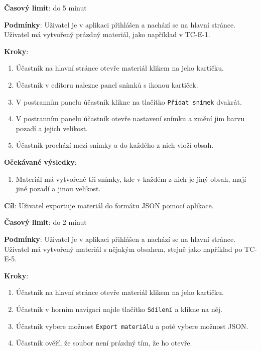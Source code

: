 \textbf{Časový limit}: do 5 minut

\textbf{Podmínky}:  Uživatel je v aplikaci přihlášen a nachází se na hlavní stránce. Uživatel má vytvořený prázdný materiál, jako například v TC-E-1.

\textbf{Kroky}:

\begin{enumerate}[leftmargin=1.4cm]
    \item Účastník na hlavní stránce otevře materiál klikem na jeho kartičku.
    \item Účastník v editoru nalezne panel snímků s ikonou kartiček.
    \item V postranním panelu účastník klikne na tlačítko \verb|Přidat snímek| dvakrát.
    \item V postranním panelu účastník otevře nastavení snímku a změní jim barvu pozadí a jejich velikost.
    \item Účastník prochází mezi snímky a do každého z nich vloží obsah.
\end{enumerate}

\textbf{Očekávané výsledky}:

\begin{enumerate}[leftmargin=1.4cm]
    \item Materiál má vytvořené tři snímky, kde v každém z nich je jiný obsah, mají jiné pozadí a jinou velikost.
\end{enumerate}






\vspace{1em}

\textbf{Cíl}: Uživatel exportuje materiál do formátu JSON pomocí aplikace.

\textbf{Časový limit}: do 2 minut

\textbf{Podmínky}:  Uživatel je v aplikaci přihlášen a nachází se na hlavní stránce. Uživatel má vytvořený materiál s nějakým obsahem, stejně jako například po TC-E-5.

\textbf{Kroky}:

\begin{enumerate}[leftmargin=1.4cm]
    \item Účastník na hlavní stránce otevře materiál klikem na jeho kartičku.
    \item Účastník v horním navigaci najde tlačítko \verb|Sdílení| a klikne na něj.
    \item Účastník vybere možnost \verb|Export materiálu| a poté vybere možnost JSON.
    \item Účastník ověří, že soubor není prázdný tím, že ho otevře.
\end{enumerate}

